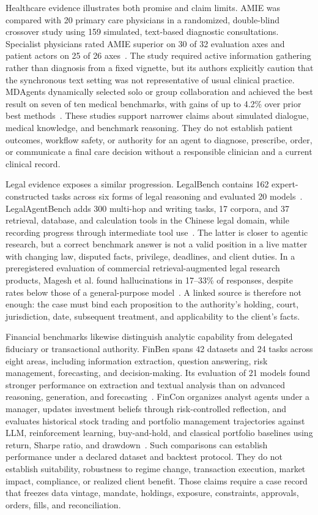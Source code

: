 Healthcare evidence illustrates both promise and claim limits. AMIE was compared with 20 primary care physicians in a randomized, double-blind crossover study using 159 simulated, text-based diagnostic consultations. Specialist physicians rated AMIE superior on 30 of 32 evaluation axes and patient actors on 25 of 26 axes~\cite{tu2025amie}. The study required active information gathering rather than diagnosis from a fixed vignette, but its authors explicitly caution that the synchronous text setting was not representative of usual clinical practice. MDAgents dynamically selected solo or group collaboration and achieved the best result on seven of ten medical benchmarks, with gains of up to 4.2\% over prior best methods~\cite{kim2024mdagents}. These studies support narrower claims about simulated dialogue, medical knowledge, and benchmark reasoning. They do not establish patient outcomes, workflow safety, or authority for an agent to diagnose, prescribe, order, or communicate a final care decision without a responsible clinician and a current clinical record.

Legal evidence exposes a similar progression. LegalBench contains 162 expert-constructed tasks across six forms of legal reasoning and evaluated 20 models~\cite{guha2023legalbench}. LegalAgentBench adds 300 multi-hop and writing tasks, 17 corpora, and 37 retrieval, database, and calculation tools in the Chinese legal domain, while recording progress through intermediate tool use~\cite{li2024legalagentbench}. The latter is closer to agentic research, but a correct benchmark answer is not a valid position in a live matter with changing law, disputed facts, privilege, deadlines, and client duties. In a preregistered evaluation of commercial retrieval-augmented legal research products, Magesh et al. found hallucinations in 17--33\% of responses, despite rates below those of a general-purpose model~\cite{magesh2025legalrag}. A linked source is therefore not enough: the case must bind each proposition to the authority's holding, court, jurisdiction, date, subsequent treatment, and applicability to the client's facts.

Financial benchmarks likewise distinguish analytic capability from delegated fiduciary or transactional authority. FinBen spans 42 datasets and 24 tasks across eight areas, including information extraction, question answering, risk management, forecasting, and decision-making. Its evaluation of 21 models found stronger performance on extraction and textual analysis than on advanced reasoning, generation, and forecasting~\cite{xie2024finben}. FinCon organizes analyst agents under a manager, updates investment beliefs through risk-controlled reflection, and evaluates historical stock trading and portfolio management trajectories against LLM, reinforcement learning, buy-and-hold, and classical portfolio baselines using return, Sharpe ratio, and drawdown~\cite{yu2024fincon}. Such comparisons can establish performance under a declared dataset and backtest protocol. They do not establish suitability, robustness to regime change, transaction execution, market impact, compliance, or realized client benefit. Those claims require a case record that freezes data vintage, mandate, holdings, exposure, constraints, approvals, orders, fills, and reconciliation.

